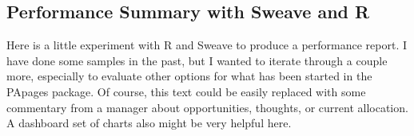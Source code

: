 \documentclass[nohyper,justified]{tufte-handout}
\begin{document}

 
\begin{wide}
\section{\Huge Performance Summary with Sweave and R}
{\Large Here is a little experiment with R and Sweave to produce a performance report.  I have done some samples in the past, but I wanted to iterate through a couple more, especially to evaluate other options for what has been started in the PApages package.  Of course, this text could be easily replaced with some commentary from a manager about opportunities, thoughts, or current allocation.  A dashboard set of charts also might be very helpful here.}
 
\hrulefill
 
\end{wide}
 
 
 
 
 
\end{document}
